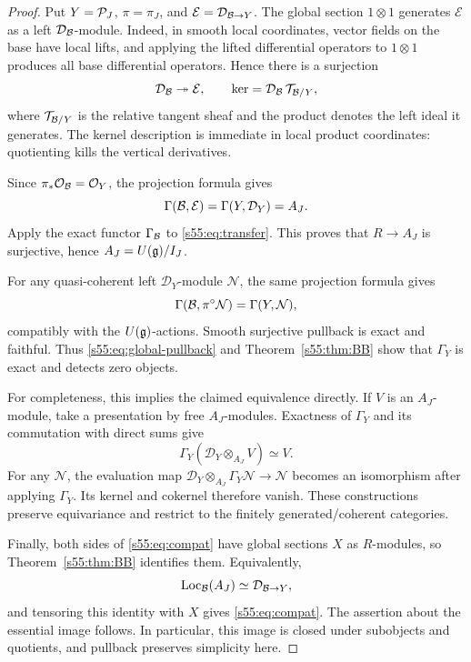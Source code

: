\begin{proof}
Put $Y=\mathcal{P}_J$, $\pi=\pi_J$, and
$\mathcal E=\mathcal D_{\mathcal{B}\to Y}$. The global section $1\otimes1$
generates $\mathcal E$ as a left $\mathcal D_{\mathcal{B}}$-module. Indeed, in
smooth local coordinates, vector fields on the base have local lifts,
and applying the lifted differential operators to $1\otimes1$ produces
all base differential operators. Hence there is a surjection
\begin{equation}
\label{s55:eq:transfer}
  \mathcal D_{\mathcal{B}}\twoheadrightarrow\mathcal E,
  \qquad
  \ker=\mathcal D_{\mathcal{B}}\,\mathcal T_{\mathcal{B}/Y},
\end{equation}
where $\mathcal T_{\mathcal{B}/Y}$ is the relative tangent sheaf and the product
denotes the left ideal it generates. The kernel description is immediate
in local product coordinates: quotienting kills the vertical derivatives.

Since $\pi_*\mathcal O_{\mathcal{B}}=\mathcal O_Y$, the projection formula gives
\[
  \Gamma(\mathcal{B},\mathcal E)=\Gamma(Y,\mathcal D_Y)=A_J.
\]
Apply the exact functor $\Gamma_{\mathcal{B}}$ to \eqref{s55:eq:transfer}. This proves
that $R\to A_J$ is surjective, hence $A_J=U(\mathfrak{g})/I_J$.

For any quasi-coherent left $\mathcal D_Y$-module $\mathcal N$, the same
projection formula gives
\begin{equation}
\label{s55:eq:global-pullback}
  \Gamma(\mathcal{B},\pi^\circ\mathcal N)
  =\Gamma(Y,\mathcal N),
\end{equation}
compatibly with the $U(\mathfrak{g})$-actions. Smooth surjective pullback is exact
and faithful. Thus \eqref{s55:eq:global-pullback} and Theorem~\ref{s55:thm:BB}
show that $\Gamma_Y$ is exact and detects zero objects.

For completeness, this implies the claimed equivalence directly. If $V$
is an $A_J$-module, take a presentation by free $A_J$-modules. Exactness
of $\Gamma_Y$ and its commutation with direct sums give
\[
 \Gamma_Y(\mathcal D_Y\otimes_{A_J}V)\simeq V.
\]
For any $\mathcal N$, the evaluation map
$\mathcal D_Y\otimes_{A_J}\Gamma_Y\mathcal N\to\mathcal N$ becomes an
isomorphism after applying $\Gamma_Y$. Its kernel and cokernel therefore
vanish. These constructions preserve equivariance and restrict to the
finitely generated/coherent categories.

Finally, both sides of \eqref{s55:eq:compat} have global sections $X$ as
$R$-modules, so Theorem~\ref{s55:thm:BB} identifies them. Equivalently,
\[
 \operatorname{Loc}_{\mathcal{B}}(A_J)\simeq\mathcal D_{\mathcal{B}\to Y},
\]
and tensoring this identity with $X$ gives \eqref{s55:eq:compat}. The assertion
about the essential image follows. In particular, this image is closed
under subobjects and quotients, and pullback preserves simplicity here.
\end{proof}

